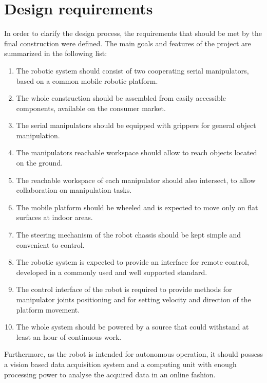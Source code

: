 
\section{Design requirements}
\label{sec:require}

In order to clarify the design process, the requirements that should be met by the final construction were defined. The main goals and features of the project are summarized in the following list:

\begin{enumerate}
\item The robotic system should consist of two cooperating serial manipulators, based on a common mobile robotic platform.
\item The whole construction should be assembled from easily accessible components, available on the consumer market.
\item The serial manipulators should be equipped with grippers for general object manipulation.
\item The manipulators reachable workspace should allow to reach objects located on the ground.
\item The reachable workspace of each manipulator should also intersect, to allow collaboration on manipulation tasks.
\item The mobile platform should be wheeled and is expected to move only on flat surfaces at indoor areas.
\item The steering mechanism of the robot chassis should be kept simple and convenient to control.
\item The robotic system is expected to provide an interface for remote control, developed in a commonly used and well supported standard.
\item The control interface of the robot is required to provide methods for manipulator joints positioning and for setting velocity and direction of the platform movement. 
\item The whole system should be powered by a source that could withstand at least an hour of continuous work.
\end{enumerate}

Furthermore, as the robot is intended for autonomous operation, it should possess a vision based data acquisition system and a computing unit with enough processing power to analyse the acquired data in an online fashion.

